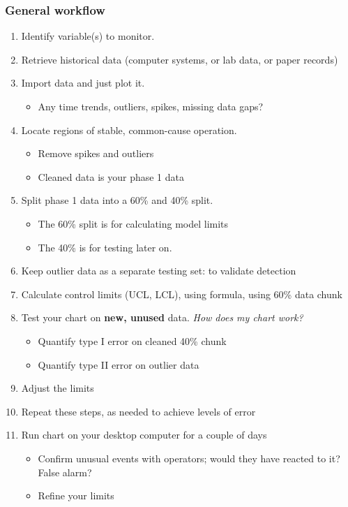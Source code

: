 \begin{frame}[allowframebreaks]\frametitle{General workflow}
	\begin{enumerate}
		\item	Identify variable(s) to monitor.
		\item	Retrieve historical data (computer systems, or lab data, or paper records)
		\item	Import data and just plot it.
		\begin{itemize}
			\item	Any time trends, outliers, spikes, missing data gaps?
		\end{itemize}
		\item	Locate regions of stable, common-cause operation.
		\begin{itemize}
			\item	Remove spikes and outliers
			\item	Cleaned data is your phase 1 data
		\end{itemize}
		\item	Split phase 1 data into a 60\% and 40\% split.
		\begin{itemize}
			\item	The 60\% split is for calculating model limits
			\item	The 40\% is for testing later on.
		\end{itemize}
		\item	Keep outlier data as a separate testing set: to validate detection
		\item	Calculate control limits (UCL, LCL), using formula, using 60\% data chunk
		\item	Test your chart on \textbf{new, unused} data. \emph{How does my chart work?}
		\begin{itemize}
			\item	Quantify type I error on cleaned 40\% chunk
			\item	Quantify type II error on outlier data
		\end{itemize}
		\item	Adjust the limits
		\item	Repeat these steps, as needed to achieve levels of error
		\item	Run chart on your desktop computer for a couple of days
		\begin{itemize}
			\item	Confirm unusual events with operators; would they have reacted to it? False alarm?
			\item	Refine your limits

\end{itemize}
\end{enumerate}
\end{frame}

